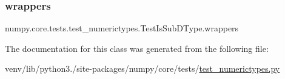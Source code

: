 \subsubsection{\texorpdfstring{wrappers}{wrappers}}
{\footnotesize\ttfamily numpy.\+core.\+tests.\+test\+\_\+numerictypes.\+Test\+Is\+Sub\+D\+Type.\+wrappers\hspace{0.3cm}{\ttfamily [static]}}



The documentation for this class was generated from the following file\+:\begin{DoxyCompactItemize}
\item 
venv/lib/python3./site-\/packages/numpy/core/tests/\hyperlink{test__numerictypes_8py}{test\+\_\+numerictypes.\+py}\end{DoxyCompactItemize}

